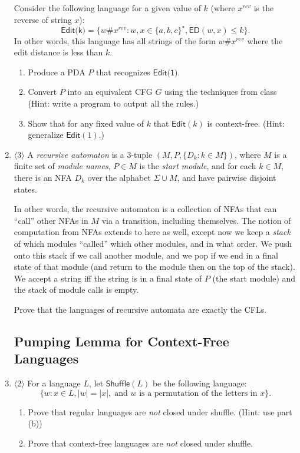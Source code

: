 \documentclass[]{article}
\newcommand{\Level}[1]{{\color{blue} $\langle$#1$\rangle$}}
\begin{document}
\begin{enumerate}
Consider the following language for a given value of $k$ (where $x^{rev}$ is the reverse of string $x$):
\[
\textsf{Edit(k)} = \{ w \# x^{rev} : w, x \in \{a, b, c\}^\star, \textsf{ED}(w,x) \le k  \}.
\]
In other words, this language has all strings of the form $w\# x^{rev}$ where the edit distance is less than $k$.
\begin{enumerate}
	\item Produce a PDA $P$ that recognizes $\textsf{Edit(1)}$.
	\item Convert $P$ into an equivalent CFG $G$ using the techniques from class (Hint: write a program to output all the rules.)
	\item Show that for any fixed value of $k$ that $\textsf{Edit}(k)$ is context-free. (Hint: generalize $\textsf{Edit}(1)$.)
\end{enumerate}

\item \Level{3} A \textit{recursive automaton} is a 3-tuple $(M, P, \{D_k : k \in M \})$, where $M$ is a finite set of \textit{module names}, $P \in M$ is the \textit{start module}, and for each $k \in M$, there is an NFA $D_k$ over the alphabet $\Sigma \cup M$, and have pairwise disjoint states. 

In other words, the recursive automaton is a collection of NFAs that can ``call'' other NFAs in $M$ via a transition, including themselves. 
The notion of computation from NFAs extends to here as well, except now we keep a \textit{stack} of which modules ``called'' which other modules, and in what order. 
We push onto this stack if we call another module, and we pop if we end in a final state of that module (and return to the module then on the top of the stack).
We accept a string iff the string is in a final state of $P$ (the start module) and the stack of module calls is empty.
		
Prove that the languages of recursive automata are exactly the CFLs.

\subsection{Pumping Lemma for Context-Free Languages}

\item \Level{2} For a language $L$, let $\textsf{Shuffle}(L)$ be the following language:
\[
\{ w : x \in L, |w| = |x|,\;\text{and $w$ is a permutation of the letters in $x$} \}.
\]
\begin{enumerate}
	\item Prove that regular languages are \emph{not} closed under shuffle. (Hint: use part (b))
	\item Prove that context-free languages are \emph{not} closed under shuffle.
\end{enumerate}


\end{enumerate}
\end{document}
